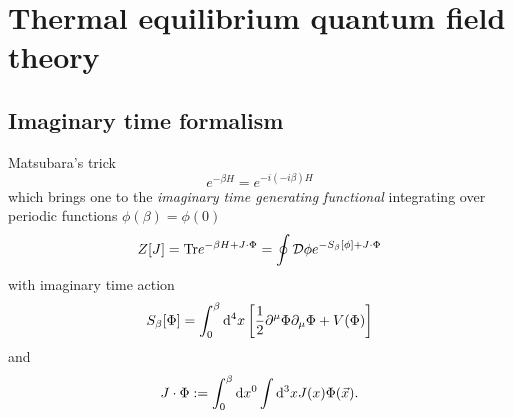 \chapter{Thermal equilibrium quantum field theory}
\section{Imaginary time formalism}
\begin{mybox}{}
Matsubara's trick
\begin{equation}
	e^{-\beta H} = e^{-i (-i\beta) H} 
\end{equation}
which brings one to the \emph{imaginary time generating functional} integrating over periodic functions $\phi(\beta)=\phi(0)$
\begin{equation}
	Z[J] = \mathrm{Tr} e^{-\beta H + J\cdot \Phi} = \oint \mathcal{D} \phi e^{-S_\beta [\phi] + J\cdot \Phi}
\end{equation}
with imaginary time action
\begin{equation}
	S_\beta[\Phi] = \int_0^\beta \mathrm{d}^4 x \left[\frac{1}{2} \partial^\mu \Phi \partial_\mu \Phi + V(\Phi)\right]
\end{equation}
and
\begin{equation}
	J \cdot \Phi := \int_0^\beta \mathrm{d} x^0 \int \mathrm{d}^3 x J(x) \Phi(\vec{x}).
\end{equation}
\end{mybox}
